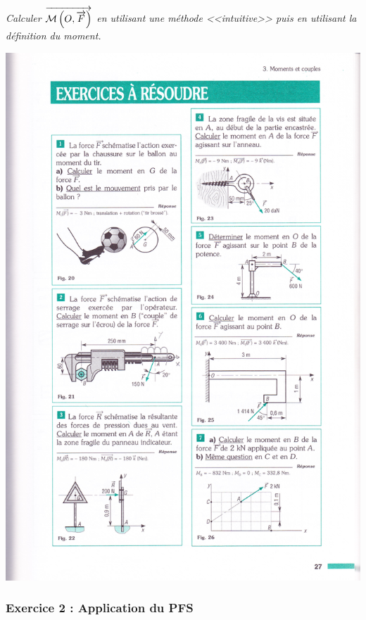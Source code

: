 \documentclass[10pt]{article}
\begin{document}
\begin{minipage}[c]{.68\linewidth}
\subparagraph*{}
\textit{Calculer $\overrightarrow{\mathcal{M}\left(O,\overrightarrow{F}\right)}$ en utilisant une méthode <<intuitive>> puis en utilisant la définition du moment.}

\end{minipage}\hfill
\begin{minipage}[c]{.3\linewidth}
\begin{center}
\includegraphics[width=\textwidth]{images/moment6}
\end{center}
\end{minipage}


\subsubsection*{Exercice 2 : Application du PFS}
\end{document}
